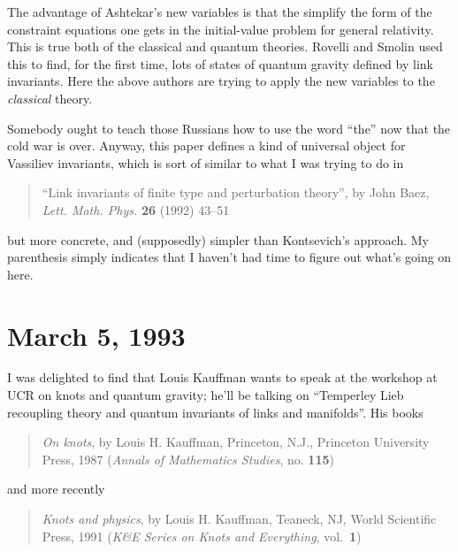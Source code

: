 \documentclass{article}
\def\tightlist{}
\renewcommand{\texttt}[1]{%
  \begingroup
  \ttfamily
  \begingroup\lccode`~=`/\lowercase{\endgroup\def~}{/\discretionary{}{}{}}%
  \begingroup\lccode`~=`[\lowercase{\endgroup\def~}{[\discretionary{}{}{}}%
  \begingroup\lccode`~=`.\lowercase{\endgroup\def~}{.\discretionary{}{}{}}%
  \catcode`/=\active\catcode`[=\active\catcode`.=\active
  \scantokens{#1\noexpand}%
  \endgroup
}
\begin{document}
The advantage of Ashtekar's new variables is that the simplify the form
of the constraint equations one gets in the initial-value problem for
general relativity. This is true both of the classical and quantum
theories. Rovelli and Smolin used this to find, for the first time, lots
of states of quantum gravity defined by link invariants. Here the above
authors are trying to apply the new variables to the \emph{classical}
theory.


Somebody ought to teach those Russians how to use the word ``the'' now
that the cold war is over. Anyway, this paper defines a kind of
universal object for Vassiliev invariants, which is sort of similar to
what I was trying to do in

\begin{quote}
``Link invariants of finite type and perturbation theory'', by John
Baez, \emph{Lett. Math. Phys.} \textbf{26} (1992) 43--51
\end{quote}

but more concrete, and (supposedly) simpler than Kontsevich's approach.
My parenthesis simply indicates that I haven't had time to figure out
what's going on here.
\hypertarget{week8}{%
\section{March 5, 1993}\label{week8}}

I was delighted to find that Louis Kauffman wants to speak at the
workshop at UCR on knots and quantum gravity; he'll be talking on
``Temperley Lieb recoupling theory and quantum invariants of links and
manifolds''. His books

\begin{quote}
\emph{On knots}, by Louis H. Kauffman, Princeton, N.J., Princeton
University Press, 1987 (\emph{Annals of Mathematics Studies}, no.
\textbf{115})
\end{quote}

and more recently

\begin{quote}
\emph{Knots and physics}, by Louis H. Kauffman, Teaneck, NJ, World
Scientific Press, 1991 (\emph{K\&E Series on Knots and Everything},
vol.~\textbf{1})
\end{quote}
\end{document}
